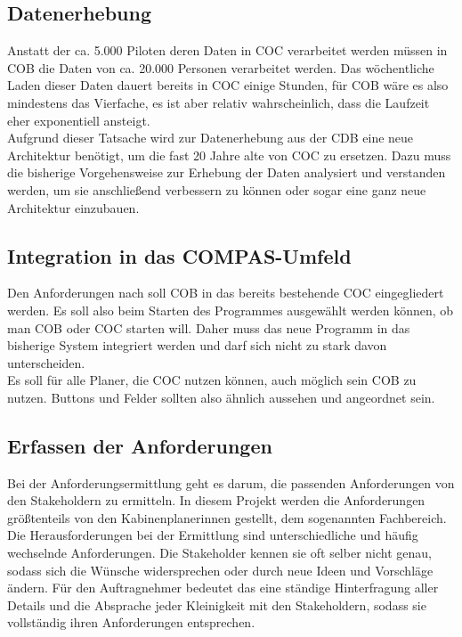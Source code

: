 \documentclass [12pt, a4paper, oneside, titlepage, ngerman]{article}
\begin{document}
\subsection{Datenerhebung}
Anstatt der ca. 5.000 Piloten deren Daten in \ac{COC} verarbeitet werden müssen in \ac{COB} die Daten von ca. 20.000 Personen verarbeitet werden. Das wöchentliche Laden dieser Daten dauert bereits in \ac{COC} einige Stunden, für \ac{COB} wäre es also mindestens das Vierfache, es ist aber relativ wahrscheinlich, dass die Laufzeit eher exponentiell ansteigt. \\
Aufgrund dieser Tatsache wird zur Datenerhebung aus der \ac{CDB} eine neue Architektur benötigt, um die fast 20 Jahre alte von \ac{COC} zu ersetzen. Dazu muss die bisherige Vorgehensweise zur Erhebung der Daten analysiert und verstanden werden, um sie anschließend verbessern zu können oder sogar eine ganz neue Architektur einzubauen.


\subsection{Integration in das COMPAS-Umfeld}
Den Anforderungen nach soll \ac{COB} in das bereits bestehende \ac{COC} eingegliedert werden. Es soll also beim Starten des Programmes ausgewählt werden können, ob man \ac{COB} oder \ac{COC} starten will. Daher muss das neue Programm in das bisherige System integriert werden und darf sich nicht zu stark davon unterscheiden. \\
Es soll für alle Planer, die \ac{COC} nutzen können, auch möglich sein \ac{COB} zu nutzen. Buttons und Felder sollten also ähnlich aussehen und angeordnet sein. %

\subsection{Erfassen der Anforderungen} 
Bei der Anforderungsermittlung geht es darum, die passenden Anforderungen von den Stakeholdern zu ermitteln. In diesem Projekt werden die Anforderungen größtenteils von den Kabinenplanerinnen gestellt, dem sogenannten Fachbereich. \\
Die Herausforderungen bei der Ermittlung sind unterschiedliche und häufig wechselnde Anforderungen. Die Stakeholder kennen sie oft selber nicht genau, sodass sich die Wünsche widersprechen oder durch neue Ideen und Vorschläge ändern. Für den Auftragnehmer bedeutet das eine ständige Hinterfragung aller Details und die Absprache jeder Kleinigkeit mit den Stakeholdern, sodass sie vollständig ihren Anforderungen entsprechen. \\
\end{document}
